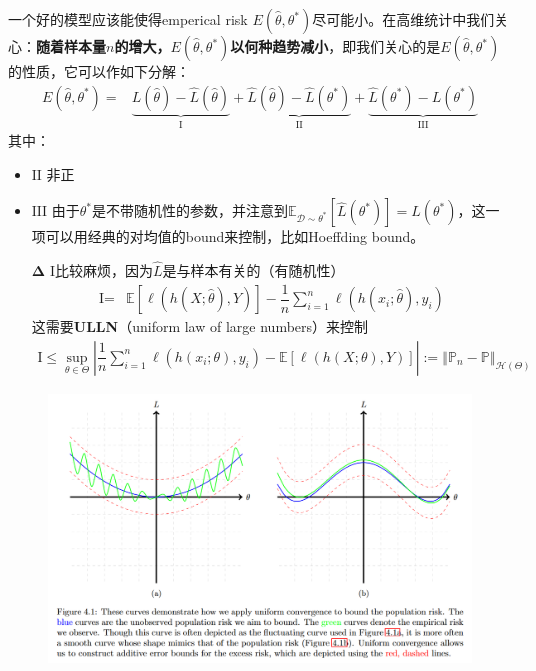 \documentclass[11pt,a4paper]{ctexart}
\numberwithin{equation}{section}%
\begin{document}
一个好的模型应该能使得emperical risk $ E(\hat{\theta},\theta ^*) $尽可能小。在高维统计中我们关心：\textbf{随着样本量$n$的增大，$ E(\hat{\theta},\theta ^* ) $以何种趋势减小}，即我们关心的是$E(\hat{\theta},\theta ^* )$的性质，它可以作如下分解：
\begin{align*}
    E(\hat{\theta},\theta ^* )=&\underbrace{L(\hat{\theta}) - \hat{L}( \hat{\theta} )}_{\text{I}} +  \underbrace{\hat{L}( \hat{\theta} ) - \hat{L}( \theta ^* )}_{\text{II}} + \underbrace{\hat{L}(\theta ^*) - L(\theta ^*)}_{\text{III}} 
\end{align*}
其中：
\begin{itemize}[topsep=2pt,itemsep=0pt]
    \item $ \text{II} $ 非正
    \item $ \text{III} $ 由于$ \theta ^* $是不带随机性的参数，并注意到$ \mathbb{E}_{\mathcal{D}\sim \theta ^*}\left[ \hat{L}(\theta ^*) \right]  = L(\theta ^*) $，这一项可以用经典的对均值的bound来控制，比如Hoeffding bound。
    \item[$ \mathbf{\Delta} $] $ \text{I} $比较麻烦，因为$ \hat{L} $是与样本有关的（有随机性）
    \begin{align*}
        \text{I}=& \mathbb{E}\left[ \ell ( h(X;\hat{\theta }), Y ) \right]  - \dfrac{ 1 }{ n  } \sum_{i=1}^n \ell ( h(x_i;\hat{\theta }), y_i ) 
    \end{align*}
    这需要\textbf{ULLN}（uniform law of large numbers）来控制
    \begin{align*}
         \text{I}\leq \sup_{\theta \in \Theta} \left\vert  \dfrac{ 1 }{ n  } \sum_{i=1}^n \ell ( h(x_i;\theta ), y_i ) - \mathbb{E}\left[ \ell ( h(X;\theta ), Y ) \right]  \right\vert := \left\Vert \mathbb{P}_n-\mathbb{P} \right\Vert _{\mathcal{H}(\Theta)} 
    \end{align*}
\end{itemize}
\begin{figure}[H]
    \centering
    \includegraphics[width=\linewidth]{images/2024-07-30-20-09-08.png}
\end{figure}
\end{document}
